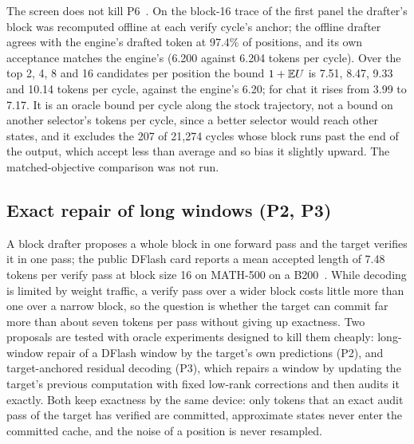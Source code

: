 The screen does not kill P6~. On the block-16 trace of the first panel the drafter's block was recomputed offline at each verify cycle's anchor; the offline drafter agrees with the engine's drafted token at 97.4\% of positions, and its own acceptance matches the engine's (6.200 against 6.204 tokens per cycle). Over the top 2, 4, 8 and 16 candidates per position the bound $1+\mathbb E U$ is 7.51, 8.47, 9.33 and 10.14 tokens per cycle, against the engine's 6.20; for chat it rises from 3.99 to 7.17. It is an oracle bound per cycle along the stock trajectory, not a bound on another selector's tokens per cycle, since a better selector would reach other states, and it excludes the 207 of 21,274 cycles whose block runs past the end of the output, which accept less than average and so bias it slightly upward. The matched-objective comparison was not run.

\subsection{Exact repair of long windows (P2, P3)}\label{app:repair}\label{sec:repair}
A block drafter proposes a whole block in one forward pass and the target verifies it in one pass; the public DFlash card reports a mean accepted length of 7.48 tokens per verify pass at block size 16 on MATH-500 on a B200~\cite{dflash4bcard}. While decoding is limited by weight traffic, a verify pass over a wider block costs little more than one over a narrow block, so the question is whether the target can commit far more than about seven tokens per pass without giving up exactness. Two proposals are tested with oracle experiments designed to kill them cheaply: long-window repair of a DFlash window by the target's own predictions (P2), and target-anchored residual decoding (P3), which repairs a window by updating the target's previous computation with fixed low-rank corrections and then audits it exactly. Both keep exactness by the same device: only tokens that an exact audit pass of the target has verified are committed, approximate states never enter the committed cache, and the noise of a position is never resampled.

